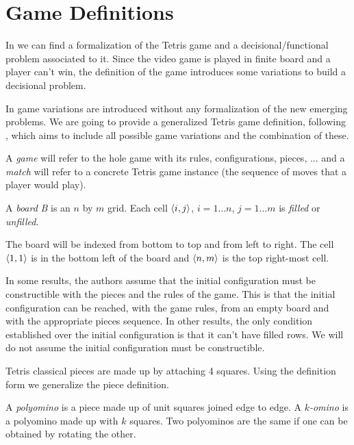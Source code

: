 \section{Game Definitions}

In \cite{TIH} we can find a formalization of the Tetris game and a decisional/functional problem associated to it. Since the video game is played in finite board and a player can't win, the definition of the game introduces some variations to build a decisional problem.

In \cite{TT,TWFP,TCB,CTV,AVG} game variations are introduced without any formalization of the new emerging problems. We are going to provide a generalized Tetris game definition, following \cite{TIH}, which aims to include all possible game variations and the combination of these. 

A \emph{game} will refer to the hole game with its rules, configurations, pieces, ... and a \emph{match} will refer to a concrete Tetris game instance (the sequence of moves that a player would play). 

\begin{definition} 
  A \emph{board} \emph{B} is an $n$ by $m$ grid. Each cell $\cell$, $i = 1\dots n$, $j = 1\dots m$ is \emph{filled} or \emph{unfilled}.
\end{definition}

The board will be indexed from bottom to top and from left to right. The cell $\cell[1][1]$ is in the bottom left of the board and $\cell[n][m]$ is the top right-most cell.

In some results, the authors assume that the initial configuration must be constructible with the pieces and the rules of the game. This is that the initial configuration can be reached, with the game rules, from an empty board and with the appropriate pieces sequence. In other results, the only condition established over the initial configuration is that it can't have filled rows. We will do not assume the initial configuration must be constructible.

\vspace{10px}

Tetris classical pieces are made up by attaching 4 squares. Using the definition form \cite{TT, WikiFandom} we generalize the piece definition.

\begin{definition}  
  A \emph{polyomino} is a piece made up of unit squares joined edge to edge. A \emph{$k$-omino} is a polyomino made up with $k$ squares. Two polyominos are the same if one can be obtained by rotating the other. 
\end{definition}

